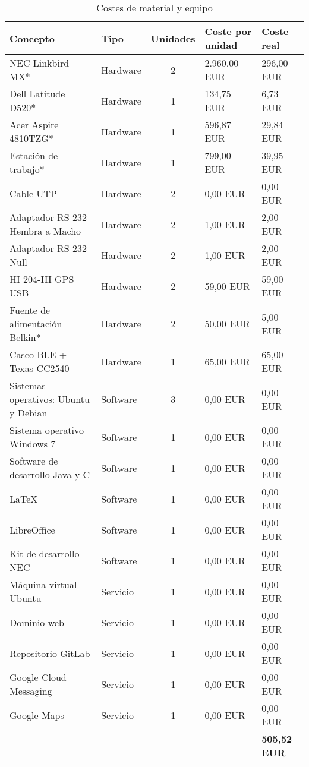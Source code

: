 \begin{table}[ht]
	\centering
	\caption{Costes de material y equipo}\label{tab:presupuestoMaterial}
	\begin{tabular}{llcll}
		\toprule
		\textbf{Concepto} & \textbf{Tipo} & \textbf{Unidades} & \textbf{Coste por unidad} & \textbf{Coste real} \\
		\midrule
		NEC Linkbird MX* & Hardware & 2 & 2.960,00 EUR & 296,00 EUR \\
		Dell Latitude D520* & Hardware & 1 & 134,75 EUR & 6,73 EUR \\
		Acer Aspire 4810TZG* & Hardware & 1 & 596,87 EUR & 29,84 EUR \\
		Estación de trabajo* & Hardware & 1 & 799,00 EUR & 39,95 EUR \\
		Cable UTP & Hardware & 2 & 0,00 EUR & 0,00 EUR \\
		Adaptador RS-232 Hembra a Macho & Hardware & 2 & 1,00 EUR & 2,00 EUR \\
		Adaptador RS-232 Null & Hardware & 2 & 1,00 EUR & 2,00 EUR \\
		HI 204-III GPS USB & Hardware & 2 & 59,00 EUR & 59,00 EUR \\
		Fuente de alimentación Belkin* & Hardware & 2 & 50,00 EUR & 5,00 EUR \\
		Casco BLE + Texas CC2540 & Hardware & 1 & 65,00 EUR & 65,00 EUR \\
		Sistemas operativos: Ubuntu y Debian & Software & 3 & 0,00 EUR & 0,00 EUR \\
		Sistema operativo Windows 7 & Software & 1 & 0,00 EUR & 0,00 EUR \\
		Software de desarrollo Java y C & Software & 1 & 0,00 EUR & 0,00 EUR \\
		LaTeX & Software & 1 & 0,00 EUR & 0,00 EUR \\
		LibreOffice & Software & 1 & 0,00 EUR & 0,00 EUR \\
		Kit de desarrollo NEC & Software & 1 & 0,00 EUR & 0,00 EUR \\
		Máquina virtual Ubuntu & Servicio & 1 & 0,00 EUR & 0,00 EUR \\
		Dominio web & Servicio & 1 & 0,00 EUR & 0,00 EUR \\
		Repositorio GitLab & Servicio & 1 & 0,00 EUR & 0,00 EUR \\
		Google Cloud Messaging & Servicio & 1 & 0,00 EUR & 0,00 EUR \\
		Google Maps & Servicio & 1 & 0,00 EUR & 0,00 EUR \\
		& & & & \textbf{505,52 EUR}\\
		\bottomrule
	\end{tabular}
\end{table}
